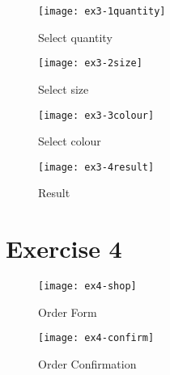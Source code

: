 \clearpage
\captionsetup{type=figure}


\clearpage
\captionsetup{type=figure}


\clearpage
\captionsetup{type=figure}


\begin{figure}[H]
  \caption{Select quantity}
  \centering
  \texttt{[image: ex3-1quantity]}
\end{figure}

\begin{figure}[H]
  \caption{Select size}
  \centering
  \texttt{[image: ex3-2size]}
\end{figure}

\begin{figure}[H]
  \caption{Select colour}
  \centering
  \texttt{[image: ex3-3colour]}
\end{figure}

\begin{figure}[H]
  \caption{Result}
  \centering
  \texttt{[image: ex3-4result]}
\end{figure}

\clearpage
\section{Exercise 4}

\begin{figure}[H]
  \caption{Order Form}
  \centering
  \texttt{[image: ex4-shop]}
\end{figure}

\begin{figure}[H]
  \caption{Order Confirmation}
  \centering
  \texttt{[image: ex4-confirm]}
\end{figure}
